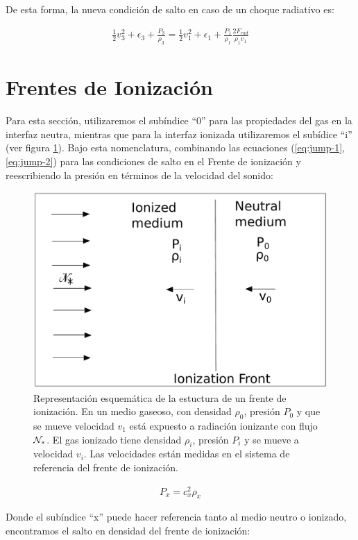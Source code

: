 De esta forma, la nueva condición de salto en caso de un choque radiativo es:

\begin{align}
  \frac{1}{2}v^2_3 + \epsilon_3 + \frac{P_3}{\rho_3} = \frac{1}{2}v^2_1 + \epsilon_1 + \frac{P_1}{\rho_1} \frac{2F_{rad}}{\rho_1v_1}\label{eq:jump-rad}
\end{align}


\section{Frentes de Ionización}
Para esta sección, utilizaremos el subíndice ``0'' para las propiedades del gas en la interfaz neutra, mientras que para la interfaz ionizada utilizaremos el subídice ``i'' (ver figura \ref{fig:IF}). Bajo esta nomenclatura, combinando las ecuaciones (\ref{eq:jump-1}, \ref{eq:jump-2}) para las condiciones de salto en el Frente de ionización y reescribiendo la presión en términos de la velocidad del sonido:

\begin{figure}
  \includegraphics[width=0.8\linewidth]{./Figures/IF}
  \caption{Representación esquemática de la estuctura de un frente de ionización. En un medio gaseoso, con densidad $\rho_0$, presión $P_0$ y que se mueve velocidad $v_1$ está expuesto a radiación ionizante con flujo $\mathcal{N}_*$. El gas ionizado tiene densidad $\rho_i$, presión $P_i$ y se mueve a velocidad $v_i$. Las velocidades están medidas en el sistema de referencia del frente de ionización.}
  \label{fig:IF}
\end{figure}

\begin{align}
  P_x = c^2_x\rho_x
\end{align}

Donde el subíndice ``x'' puede hacer referencia tanto al medio neutro o ionizado, encontramos el salto en densidad del frente de ionización:

